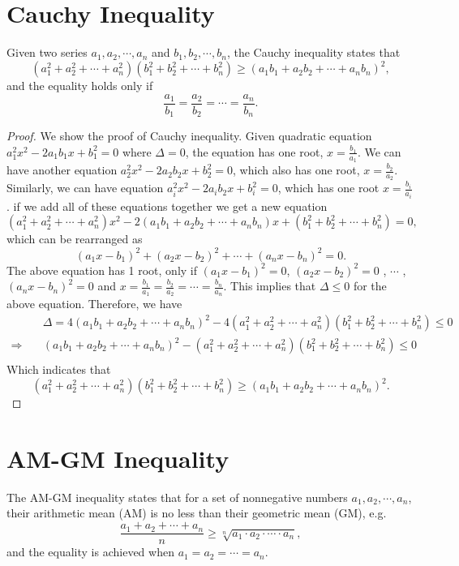 \documentclass[11pt, oneside]{article}   	%
\begin{document}
\section{Cauchy Inequality}
Given two series $a_1, a_2, \cdots, a_n$ and $b_1, b_2, \cdots, b_n$, the Cauchy inequality states that
\[(a_1^2+a_2^2+\cdots+a_n^2)(b_1^2+b_2^2+\cdots+b_n^2)\ge (a_1 b_1 + a_2 b_2 +\cdots + a_n b_n)^2,\]
and the equality holds only if 
\[\frac{a_1}{b_1}=\frac{a_2}{b_2}=\cdots=\frac{a_n}{b_n}.\]
\begin{proof}
We show the proof of Cauchy inequality. Given quadratic equation $a_1^2 x^2 - 2 a_1 b_1x + b_1^2=0$ where $\Delta = 0$,  the equation has one root, $x=\frac{b_1}{a_1}$. We can have another equation $a_2^2 x^2 - 2 a_2 b_2x + b_2^2=0$, which also has one root, $x=\frac{b_2}{a_2}$. Similarly, we can have equation $a_i^2 x^2 - 2 a_i b_2x + b_i^2=0$, which has one root $x=\frac{b_i}{a_i}$. if we add all of these equations together we get  a new equation
\[(a_1^2 + a_2^2+ \cdots + a_n^2)x^2 -2(a_1 b_1 +  a_2 b_2 + \cdots +  a_n b_n)x + (b_1^2 + b_2^2+ \cdots + b_n^2)=0,\] 
which can be rearranged as
\[(a_1x - b_1)^2+(a_2x - b_2)^2 +  \cdots +(a_nx - b_n)^2 = 0 .\]
The above equation has 1 root, only if $(a_1x - b_1)^2=0$, $(a_2x - b_2)^2=0$ , $\cdots$ , $(a_nx - b_n)^2=0$  and $x=\frac{b_1}{a_1} = \frac{b_2}{a_2} = \cdots = \frac{b_n}{a_n}$. This implies that $\Delta \le 0$ for the above equation. Therefore, we have 
\begin{align*}
&\Delta = 4(a_1 b_1 +  a_2 b_2 + \cdots +  a_n b_n)^2 - 4(a_1^2 + a_2^2+ \cdots + a_n^2)(b_1^2 + b_2^2+ \cdots + b_n^2) \le 0 \\
\Rightarrow \quad & (a_1 b_1 +  a_2 b_2 + \cdots +  a_n b_n)^2 - (a_1^2 + a_2^2+ \cdots + a_n^2)(b_1^2 + b_2^2+ \cdots + b_n^2) \le 0 \\
\end{align*}
Which indicates that \[ (a_1^2 + a_2^2+ \cdots + a_n^2)(b_1^2 + b_2^2+ \cdots + b_n^2) \ge (a_1 b_1 +  a_2 b_2 + \cdots +  a_n b_n)^2 .\]
\end{proof}

\section{AM-GM Inequality}
The AM-GM inequality states that for a set of nonnegative numbers $a_1, a_2, \cdots, a_n$, their arithmetic mean (AM) is no less than their geometric mean (GM), e.g.
\[\frac{a_1+a_2+\cdots+a_n}{n} \ge \sqrt[n]{a_1 \cdot a_2 \cdot \cdots \cdot a_n}, \]
and the equality is achieved when $a_1=a_2=\cdots=a_n$.
\end{document}
